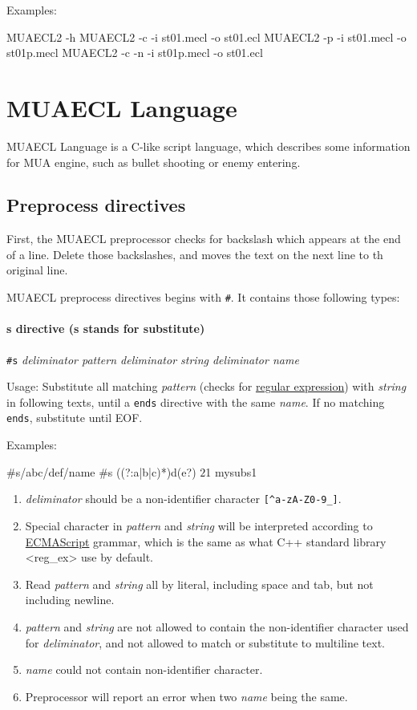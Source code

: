 \documentclass{article}
\begin{document}
Examples:

\begin{MUAvbt}
MUAECL2 -h
MUAECL2 -c -i st01.mecl -o st01.ecl
MUAECL2 -p -i st01.mecl -o st01p.mecl
MUAECL2 -c -n -i st01p.mecl -o st01.ecl
\end{MUAvbt}

\section{MUAECL Language}

MUAECL Language is a C-like script language, which describes some information for MUA engine, such as bullet shooting or enemy entering.

\subsection{Preprocess directives}

First, the MUAECL preprocessor checks for backslash which appears at the end of a line. Delete those backslashes, and moves the text on the next line to th original line.

MUAECL preprocess directives begins with \verb|#|. It contains those following types:

\paragraph{s directive (s stands for substitute)} \verb|#s| \textit{deliminator pattern deliminator string deliminator name}

Usage: Substitute all matching \textit{pattern} (checks for \href{https://en.wikipedia.org/wiki/Regular_expression}{regular expression}) with \textit{string} in following texts, until a \verb|ends| directive with the same \textit{name}. If no matching \verb|ends|, substitute until EOF.

Examples:

\begin{MUAvbt}
#s/abc/def/name
#s ((?:a|b|c)*)d(e?) $2$1 mysubs1
\end{MUAvbt}

\begin{enumerate}
	\item \textit{deliminator} should be a non-identifier character \verb|[^a-zA-Z0-9_]|.
	\item Special character in \textit{pattern} and \textit{string} will be interpreted according to \href{https://en.cppreference.com/w/cpp/regex/ecmascript}{ECMAScript} grammar, which is the same as what C++ standard library <reg\_ex> use by default.
	\item Read \textit{pattern} and \textit{string} all by literal, including space and tab, but not including newline.
	\item \textit{pattern} and \textit{string} are not allowed to contain the non-identifier character used for \textit{deliminator}, and not allowed to match or substitute to multiline text.
	\item \textit{name} could not contain non-identifier character.
	\item Preprocessor will report an error when two \textit{name} being the same.
\end{enumerate}
\end{document}
